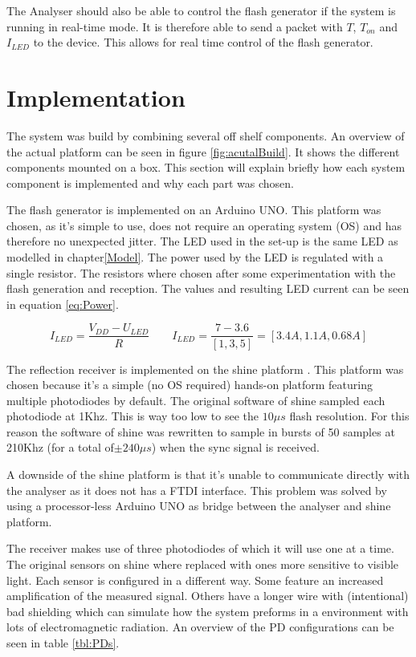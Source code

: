 The Analyser should also be able to control the flash generator if the system is running in real-time mode. It is therefore able to send a packet with $T$, ${T_{on}}$ and $I_{LED}$ to the device. This allows for real time control of the flash generator.

\section{Implementation}
The system was build by combining several off shelf components. An overview of the actual platform can be seen in figure \ref{fig:acutalBuild}. It shows the different components mounted on a box. This section will explain briefly how each system component is implemented and why each part was chosen.

The flash generator is implemented on an Arduino UNO\cite{ArduinoUno}. This platform was chosen, as it's simple to use, does not require an operating system (OS) and has therefore no unexpected jitter. The LED used in the set-up is the same LED as modelled in chapter\ref{Model}. The power used by the LED is regulated with a single resistor. The resistors where chosen after some experimentation with the flash generation and reception. The values and resulting LED current can be seen in equation \ref{eq:Power}.

\begin{equation}
\label{eq:Power}
I_{LED}=\frac{V_{DD} - U_{LED}}{R}
\qquad
I_{LED} = \frac{7 - 3.6}{[1, 3, 5]} = [3.4A, 1.1A, 0.68A]
\end{equation}

The reflection receiver is implemented on the shine platform \cite{Shine}. This platform was chosen because it's a simple (no OS required) hands-on platform featuring multiple photodiodes by default. The original software of shine sampled each photodiode at 1Khz. This is way too low to see the $10\mu s$ flash resolution. For this reason the software of shine was rewritten to sample in bursts of 50 samples at 210Khz (for a total of$\pm 240\mu s$) when the sync signal is received.

A downside of the shine platform is that it's unable to communicate directly with the analyser as it does not has a FTDI interface. This problem was solved by using a processor-less Arduino UNO as bridge between the analyser and shine platform.

The receiver makes use of three photodiodes of which it will use one at a time. The original sensors on shine where replaced with ones more sensitive to visible light. Each sensor is configured in a different way. Some feature an increased amplification of the measured signal. Others have a longer wire with (intentional) bad shielding which can simulate how the system preforms in a environment with lots of electromagnetic radiation. An overview of the PD configurations can be seen in table \ref{tbl:PDs}.

